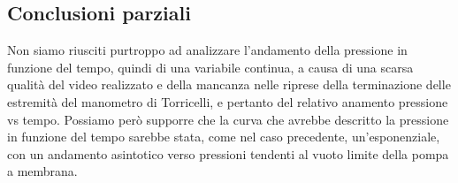 
\subsection{Conclusioni parziali}

Non siamo riusciti purtroppo ad analizzare l'andamento della pressione in funzione del tempo, quindi di una variabile continua, a causa di una scarsa qualità del video realizzato e della mancanza nelle riprese della terminazione delle estremità del manometro di Torricelli, e pertanto del relativo anamento pressione vs tempo. Possiamo però supporre che la curva che avrebbe descritto la pressione in funzione del tempo sarebbe stata, come nel caso precedente, un'esponenziale, con un andamento asintotico verso pressioni tendenti al vuoto limite della pompa a membrana.
